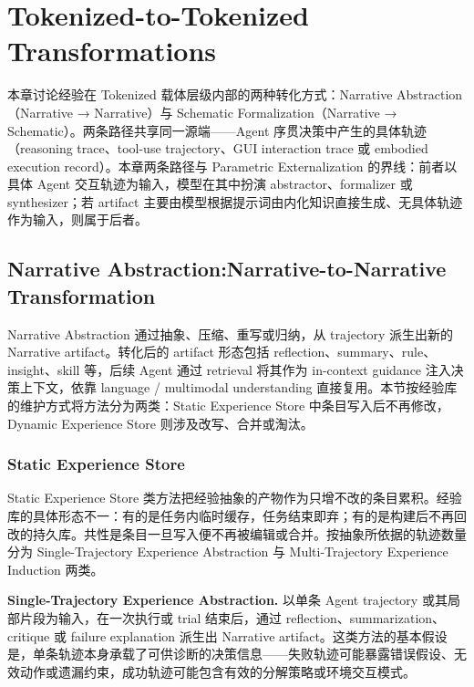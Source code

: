 \section{Tokenized-to-Tokenized Transformations}

本章讨论经验在 Tokenized 载体层级内部的两种转化方式：Narrative Abstraction（Narrative → Narrative）与 Schematic Formalization（Narrative → Schematic）。两条路径共享同一源端——Agent 序贯决策中产生的具体轨迹（reasoning trace、tool-use trajectory、GUI interaction trace 或 embodied execution record）。本章两条路径与 Parametric Externalization 的界线：前者以具体 Agent 交互轨迹为输入，模型在其中扮演 abstractor、formalizer 或 synthesizer；若 artifact 主要由模型根据提示词由内化知识直接生成、无具体轨迹作为输入，则属于后者。

\subsection{Narrative Abstraction:Narrative-to-Narrative Transformation}

Narrative Abstraction 通过抽象、压缩、重写或归纳，从 trajectory 派生出新的 Narrative artifact。转化后的 artifact 形态包括 reflection、summary、rule、insight、skill 等，后续 Agent 通过 retrieval 将其作为 in-context guidance 注入决策上下文，依靠 language / multimodal understanding 直接复用。本节按经验库的维护方式将方法分为两类：Static Experience Store 中条目写入后不再修改，Dynamic Experience Store 则涉及改写、合并或淘汰。

\subsubsection{Static Experience Store}

Static Experience Store 类方法把经验抽象的产物作为只增不改的条目累积。经验库的具体形态不一：有的是任务内临时缓存，任务结束即弃；有的是构建后不再回改的持久库。共性是条目一旦写入便不再被编辑或合并。按抽象所依据的轨迹数量分为 Single-Trajectory Experience Abstraction 与 Multi-Trajectory Experience Induction 两类。

\textbf{Single-Trajectory Experience Abstraction.} 以单条 Agent trajectory 或其局部片段为输入，在一次执行或 trial 结束后，通过 reflection、summarization、critique 或 failure explanation 派生出 Narrative artifact。这类方法的基本假设是，单条轨迹本身承载了可供诊断的决策信息——失败轨迹可能暴露错误假设、无效动作或遗漏约束，成功轨迹可能包含有效的分解策略或环境交互模式。

